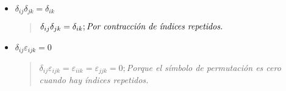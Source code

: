 \documentclass[a4paper,12pt,twoside,final,spanish]{article}
\newcommand\Ccancel[2][black]{\renewcommand\CancelColor{\color{#1}}\cancel{#2}}
\begin{document}
\begin{itemize}
\begin{quote}
$\varepsilon_{ijk}A_{j}A_{k};\hfill\textit{Sólo quedarán los términos donde épsilon sea distinto de cero.}\\
=\varepsilon_{123}A_{2}A_{3}+\varepsilon_{312}A_{1}A_{2}+\varepsilon_{231}A_{3}A_{1}+\varepsilon_{321}A_{2}A_{1}+\varepsilon_{132}A_{3}A_{2}+\varepsilon_{213}A_{1}A_{3}$\\
\textit{Las permutaciones cíclicas de 123 valen 1 y las permutaciones cíclicas de 321 valen -1.}\\
$=A_{2}A_{3}+A_{1}A_{2}+A_{3}A_{1}-A_{2}A_{1}-A_{3}A_{2}-A_{1}A_{3}\\
\textit{Como el producto escalar conmutativo se pueden reordenar los términos}\\
=\Ccancel[red]{A_{2}A_{3}}\Ccancel[blue]{+A_{1}A_{2}}\Ccancel[green]{+A_{3}A_{1}}\Ccancel[blue]{-A_{1}A_{2}}\Ccancel[red]{-A_{2}A_{3}}\Ccancel[green]{-A_{3}A_{1}}=0$\\

Otra forma de demostrarlo es jugar con los índices:\\

$\varepsilon_{ijk}A_{j}A_{k}=-\varepsilon_{ikj}A_{j}A_{k}=-\varepsilon_{ikj}A_{k}A_{j};\hfill j=m\\
=-\varepsilon_{ikm}A_{k}A_{m};\hfill k=j\\
=-\varepsilon_{ijm}A_{j}A_{m};\hfill m=k\\
=-\varepsilon_{ijk}A_{j}A_{k};\hfill \textit{Pasando al otro término.}\\
\implies\varepsilon_{ijk}A_{j}A_{k}+\varepsilon_{ijk}A_{j}A_{k}=0\hfill\textit{Sumando.}\\
\implies 2\varepsilon_{ijk}A_{j}A_{k}=0\hfill\textit{Pasando el 2 dividiendo.}\\
\implies\varepsilon_{ijk}A_{j}A_{k}=0$
\end{quote}

\item $\delta_{ij}\delta_{jk}=\delta_{ik}$

\begin{quote}
$\delta_{ij}\delta_{jk}=\delta_{ik};\hfill \textit{Por contracción de índices repetidos.}$
\end{quote}

\item $\delta_{ij}\varepsilon_{ijk}=0$

\begin{quote}
$\delta_{ij}\varepsilon_{ijk}=\varepsilon_{iik}=\varepsilon_{jjk}=0;$\quad\textit{Porque el símbolo de permutación es cero cuando hay índices repetidos.}
\end{quote}
\end{itemize}
\end{document}
